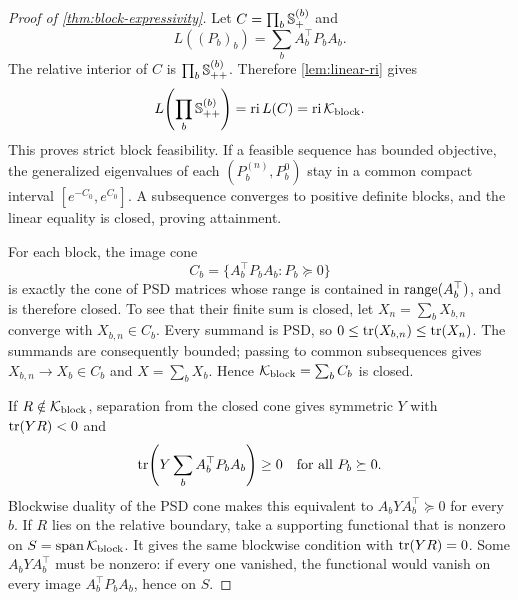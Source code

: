 \begin{proof}[Proof of \cref{thm:block-expressivity}]
Let \(C=\prod_b\mathbb S_{+}^{(b)}\) and
\[
  L((P_b)_b)=\sum_bA_b^\top P_bA_b.
\]
The relative interior of \(C\) is \(\prod_b\mathbb S_{++}^{(b)}\).  Therefore
\cref{lem:linear-ri} gives
\[
  L\!\left(\prod_b\mathbb S_{++}^{(b)}\right)
  =\operatorname{ri} L(C)=\operatorname{ri}\mathcal K_{\mathrm{block}}.
\]
This proves strict block feasibility.  If a feasible sequence has bounded
objective, the generalized eigenvalues of each
\((P_b^{(n)},P_b^0)\) stay in a common compact interval
\([e^{-C_0},e^{C_0}]\).  A subsequence converges to positive definite blocks,
and the linear equality is closed, proving attainment.

For each block, the image cone
\[
  C_b=\{A_b^\top P_bA_b:P_b\succeq0\}
\]
is exactly the cone of PSD matrices whose range is contained in
\(\operatorname{range}(A_b^\top)\), and is therefore closed.  To see that their finite sum
is closed, let \(X_n=\sum_bX_{b,n}\) converge with \(X_{b,n}\in C_b\).
Every summand is PSD, so
\(0\le\operatorname{tr}(X_{b,n})\le\operatorname{tr}(X_n)\).  The summands are consequently bounded;
passing to common subsequences gives \(X_{b,n}\to X_b\in C_b\) and
\(X=\sum_bX_b\).  Hence
\(\mathcal K_{\mathrm{block}}=\sum_bC_b\) is closed.

If \(R\notin\mathcal K_{\mathrm{block}}\), separation from the closed
cone gives symmetric \(Y\) with \(\operatorname{tr}(YR)<0\) and
\[
  \operatorname{tr}\!\left(Y\sum_bA_b^\top P_bA_b\right)\ge0
  \quad\text{for all }P_b\succeq0.
\]
Blockwise duality of the PSD cone makes this equivalent to
\(A_bYA_b^\top\succeq0\) for every \(b\).  If \(R\) lies on the relative
boundary, take a supporting functional that is nonzero on
\(S=\operatorname{span}\mathcal K_{\mathrm{block}}\).  It gives the same
blockwise condition with \(\operatorname{tr}(YR)=0\).  Some
\(A_bYA_b^\top\) must be nonzero: if every one vanished, the functional
would vanish on every image \(A_b^\top P_bA_b\), hence on \(S\).
\end{proof}

